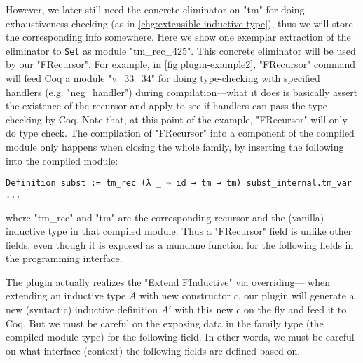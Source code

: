However, we later still need the concrete eliminator on "tm" for doing
exhaustiveness checking (as in \ref{chg:extensible-inductive-type}),
thus we will store the corresponding info somewhere.  Here we show one
exemplar extraction of the eliminator to \texttt{Set} as module
"tm_rec_425". This concrete eliminator will be used by our "FRecursor".
For example, in \cref{fig:plugin-example2}, "FRecursor" command will
feed Coq a module "v_33_34" for doing type-checking with specified
handlers (e.g. "neg_handler") during compilation---what it does is
basically
assert the existence of the recursor and apply to see if handlers can
pass the type checking by Coq.
Note that, at this point of the example,
"FRecursor" will only do type check. The compilation of "FRecursor" into
a component of the compiled module only happens when closing the whole
family, by inserting the following into the compiled module: 
\begin{verbatim}
Definition subst := tm_rec (λ _ ⇒ id → tm → tm) subst_internal.tm_var ...
\end{verbatim}
where "tm_rec" and "tm" are the corresponding recursor and
the (vanilla) inductive type in that compiled module. Thus a "FRecursor"
field is unlike other fields, even though it is exposed as a mundane
function for the following fields in the programming interface.

The plugin actually realizes the "Extend FInductive" via overriding---%
when extending an inductive type $A$ with new constructor $c$, our
plugin will generate a new (syntactic) inductive definition $A'$ with
this new $c$ on the fly and feed it to Coq. But we must be careful on
the exposing data in the family type (the compiled module type) for the
following field. In other words, we must be careful on what interface
(context) the following fields are defined based on. 

